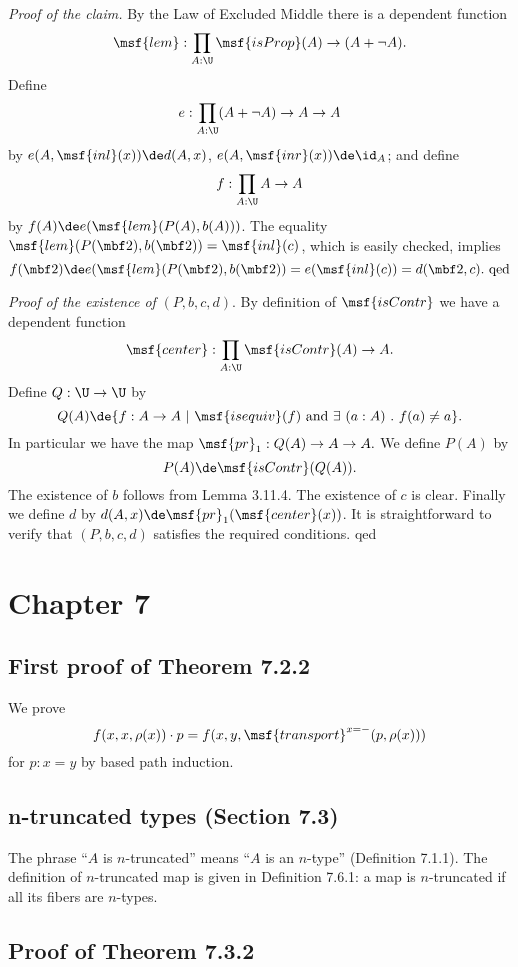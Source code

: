 \documentclass[12pt]{article}
\begin{document}
\nn\emph{Proof of the claim.} By the Law of Excluded Middle there is a dependent function 
$$
\msf{lem}:\prod_{A:\U}\msf{isProp}(A)\to(A+\neg A).
$$ 
Define 
$$
e:\prod_{A:\U}(A+\neg A)\to A\to A
$$ 
by $e(A,\msf{inl}(x))\de d(A,x)$, $e(A,\msf{inr}(x))\de\id_A$; and define 
$$
f:\prod_{A:\U}A\to A
$$ 
by $f(A)\de e(\msf{lem}(P(A),b(A)))$. The equality $\msf{lem}(P(\mbf2),b(\mbf2))=\msf{inl}(c)$, which is easily checked, implies  
$$
f(\mbf2)\de e(\msf{lem}(P(\mbf2),b(\mbf2))=e(\msf{inl}(c))=d(\mbf2,c).\text{ qed} 
$$ 

\nn\emph{Proof of the existence of} $(P,b,c,d)$. By definition of $\msf{isContr}$ we have a dependent function 
$$
\msf{center}:\prod_{A:\U}\msf{isContr}(A)\to A.
$$ 
Define $Q:\U\to\U$ by 
$$
Q(A)\de\{f:A\to A\ |\ \msf{isequiv}(f)\text{ and }\exists\ (a:A)\ .\ f(a)\neq a\}.
$$ 
In particular we have the map 
$
\msf{pr}_1:Q(A)\to A\to A.
$ 
We define $P(A)$ by 
$$
P(A)\de\msf{isContr}(Q(A)).
$$ 
The existence of $b$ follows from Lemma 3.11.4. The existence of $c$ is clear. Finally we define $d$ by $d(A,x)\de\msf{pr}_1(\msf{center}(x))$. It is straightforward to verify that $(P,b,c,d)$ satisfies the required conditions. qed


\section{Chapter 7}


\subsection{First proof of Theorem 7.2.2}

We prove 
$$
f(x,x,\rho(x))\cdot p=f(x,y,\msf{transport}^{x=-}(p,\rho(x)))
$$ 
for $p:x=y$ by based path induction.


\subsection{n-truncated types (Section 7.3)}

The phrase ``$A$ is $n$-truncated'' means ``$A$ is an $n$-type'' (Definition 7.1.1). The definition of $n$-truncated map is given in Definition 7.6.1: a map is $n$-truncated if all its fibers are $n$-types.


\subsection{Proof of Theorem 7.3.2}
\end{document}
